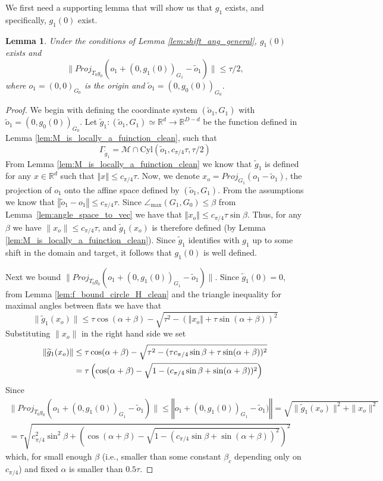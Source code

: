 \documentclass[12pt]{article}
\newtheorem{Lemma}[Theorem]{Lemma}
\theoremstyle{remark}
\newcommand{\RR}{\mathbb{R}}
\newcommand{\MM}{\mathcal{M}}
\newcommand{\norm}[1]{\left\Vert #1 \right\Vert}
\newcommand{\wtilde}[1]{\widetilde{#1}}
\newcommand{\maxangle}{\angle_{\max}}
\begin{document}
\begin{appendices}
We first need a supporting lemma that will show us that $g_{1}$ exists, and specifically, $g_{1}(0)$ exist.
\begin{Lemma} \label{lem:rough_w_bound}
Under the conditions of Lemma \ref{lem:shift_ang_general}, $g_{1}(0)$ exists and 
\[
\|Proj_{T_0 g_0} (o_1 + (0, g_{1}(0))_{G_1} - \tilde o_1) \| \leq \tau/2,
\]
where $o_1 = (0,0)_{G_0}$ is the origin and $\tilde o_1 = (0, g_0(0))_{G_0}$.
\end{Lemma}
\begin{proof}
We begin with defining the coordinate system $(\tilde o_1, G_1)$ with $\tilde o_1 = (0, g_0(0))_{G_0}$. Let $\wtilde g_1:(\wtilde o_1,G_1) \simeq \RR^d \to \RR^{D-d}$ be the function defined in Lemma \ref{lem:M_is_locally_a_fuinction_clean}, such that 
\[
\Gamma_{\wtilde g_1} =  \MM \cap \textrm{Cyl}(\wtilde o_1,c_{\pi/4}\tau, \tau/2)
\]
From Lemma \ref{lem:M_is_locally_a_fuinction_clean} we know that $\wtilde g_1$ is defined for any $x\in \RR^d$ such that $\norm{x} \leq c_{\pi/4}\tau$.
Now, we denote $x_o = Proj_{G_1}(o_1 - \tilde o_1)$, the projection of $o_1$ onto the affine space defined by $(\tilde o_1, G_1)$.
From the assumptions we know that $\norm {\tilde o_1 - o_1} \leq  c_{\pi/4} \tau$. 
Since $\maxangle (G_1,G_0) \leq \beta$ from Lemma~\ref{lem:angle_space_to_vec} we have that $\norm{x_o} \leq c_{\pi/4} \tau \sin \beta$. 
Thus, for any $\beta$ we have  $\|x_o\| \leq c_{\pi/4} \tau$, and $\wtilde{g}_1(x_o)$ is therefore defined (by Lemma \ref{lem:M_is_locally_a_fuinction_clean}). Since $\wtilde g_1$ identifies with $g_1$ up to some shift in the domain and target, it follows that $g_1(0)$ is well defined.

Next we bound  $ \|Proj_{T_0g_0} (o_1 + (0, g_{1}(0))_{G_1} - \tilde o_1) \| $.
Since $\wtilde{g}_1(0) = 0$, from Lemma \ref{lem:f_bound_circle_H_clean} and the triangle inequality for maximal angles between flats
we have that 
\[
\|\wtilde{g}_1(x_o)\| \leq \tau\cos(\alpha + \beta)-\sqrt{\tau^2-(\norm{x_o} + \tau\sin(\alpha+\beta))^2}
\]
Substituting $\|x_o\|$ in the right hand side we set 
\begin{align}
\|\wtilde{g}_1(x_o)\| &\leq \tau\cos(\alpha + \beta)-\sqrt{\tau^2-(\tau c_{\pi/4} \sin \beta + \tau\sin(\alpha+\beta))^2} \notag\\
&= \tau \left( \cos(\alpha + \beta)-\sqrt{1-(c_{\pi/4} \sin \beta + \sin(\alpha+\beta))^2} \right)    
\end{align}
Since  
\begin{multline}
 \|Proj_{T_0g_0} (o_1 + (0, g_{1}(0))_{G_1} - \tilde o_1) \| \leq \norm{o_1 + (0, g_{1}(0))_{G_1} - \tilde o_1)}   = \sqrt{\|\wtilde{g}_1(x_o)\|^2 + \|x_o\|^2} 
\\
= \tau \sqrt{c_{\pi/4}^2 \sin^2 \beta + \left( \cos(\alpha + \beta)-\sqrt{1-(c_{\pi/4} \sin \beta + \sin(\alpha+\beta))^2} \right)^2 }
\end{multline}
which, for small enough $\beta$ (i.e., smaller than some constant $\beta_c$ depending only on $c_{\pi/4}$) and fixed $\alpha$ is smaller than $0.5 \tau$.


\end{proof}
\end{appendices}
\end{document}
